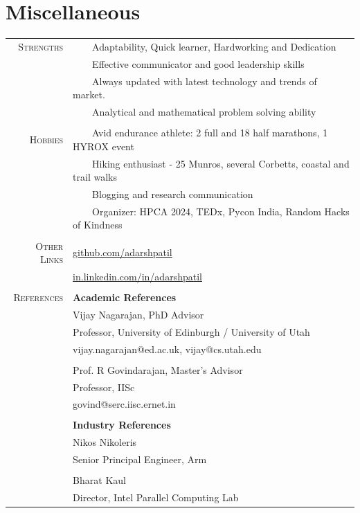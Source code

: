 \documentclass[a4paper,10pt]{article} %
\newcommand{\tabitem}{~~\llap{\textbullet}~~}
\begin{document}

\section{Miscellaneous}
\begin{tabular}{rl}
\textsc{Strengths} & \tabitem Adaptability, Quick learner, Hardworking and Dedication\\
& \tabitem Effective communicator and good leadership skills \\
& \tabitem Always updated with latest technology and trends of market.\\
& \tabitem Analytical and mathematical problem solving ability \\
& \\
\textsc{Hobbies} & \tabitem Avid endurance athlete: 2 full and 18 half marathons, 1 HYROX event\\
& \tabitem Hiking enthusiast - 25 Munros, several Corbetts, coastal and trail walks\\
& \tabitem Blogging and research communication \\
& \tabitem Organizer:  HPCA 2024, TEDx, Pycon India, Random Hacks of Kindness\\
& \\
\textsc{Other Links} & \href{https://github.com/adarshpatil}{github.com/adarshpatil} \\
& \href{https://in.linkedin.com/in/adarshpatil}{in.linkedin.com/in/adarshpatil}\\
&\\
\textsc{References} & \textbf{Academic References} \\
& Vijay Nagarajan, PhD Advisor \\
& Professor, University of Edinburgh / University of Utah\\
& vijay.nagarajan@ed.ac.uk, vijay@cs.utah.edu\\
&\\
& Prof. R Govindarajan, Master's Advisor \\
& Professor, IISc\\
& govind@serc.iisc.ernet.in \\
&\\

& \textbf{Industry References} \\
& Nikos Nikoleris \\
& Senior Principal Engineer, Arm \\
& \\
& Bharat Kaul \\
& Director, Intel Parallel Computing Lab \\
\end{tabular}
\end{document}
